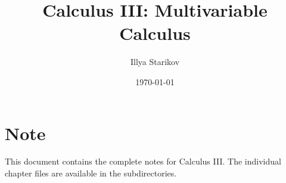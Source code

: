 \documentclass[12pt]{article}
\title{Calculus III: Multivariable Calculus}
\author{Illya Starikov}
\date{\today}
\begin{document}
\maketitle

\section*{Note}
This document contains the complete notes for Calculus III. 
The individual chapter files are available in the subdirectories.
\end{document}
